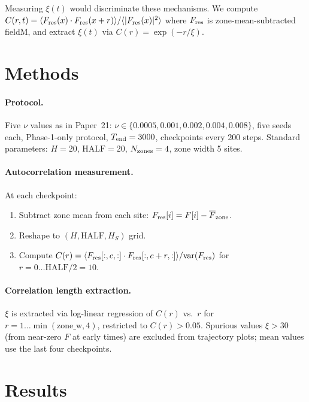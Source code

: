 \documentclass[11pt]{article}
\begin{document}
Measuring $\xi(t)$ would discriminate these mechanisms.
We compute $C(r,t) = \langle F_{\rm res}(x)\cdot F_{\rm res}(x+r)\rangle / \langle |F_{\rm res}(x)|^2\rangle$
where $F_{\rm res}$ is zone-mean-subtracted fieldM, and extract $\xi(t)$ via
$C(r) = \exp(-r/\xi)$.

\section{Methods}

\paragraph{Protocol.}
Five $\nu$ values as in Paper~21: $\nu \in \{0.0005, 0.001, 0.002, 0.004, 0.008\}$,
five seeds each, Phase-1-only protocol, $T_{\rm end}=3000$, checkpoints every 200 steps.
Standard parameters: $H=20$, $\mathrm{HALF}=20$, $N_{\rm zones}=4$, zone width 5 sites.

\paragraph{Autocorrelation measurement.}
At each checkpoint:
\begin{enumerate}
  \item Subtract zone mean from each site: $F_{\rm res}[i] = F[i] - \overline{F}_{\rm zone}$.
  \item Reshape to $(H, \mathrm{HALF}, H_S)$ grid.
  \item Compute $C(r) = \langle F_{\rm res}[:,c,:]\cdot F_{\rm res}[:,c+r,:]\rangle / \mathrm{var}(F_{\rm res})$
    for $r=0\ldots \mathrm{HALF}/2 = 10$.
\end{enumerate}

\paragraph{Correlation length extraction.}
$\xi$ is extracted via log-linear regression of $C(r)$ vs.\ $r$ for $r=1\ldots\min(\mathrm{zone\_w},4)$,
restricted to $C(r) > 0.05$.
Spurious values $\xi > 30$ (from near-zero $F$ at early times) are excluded
from trajectory plots; mean values use the last four checkpoints.

\section{Results}
\end{document}
